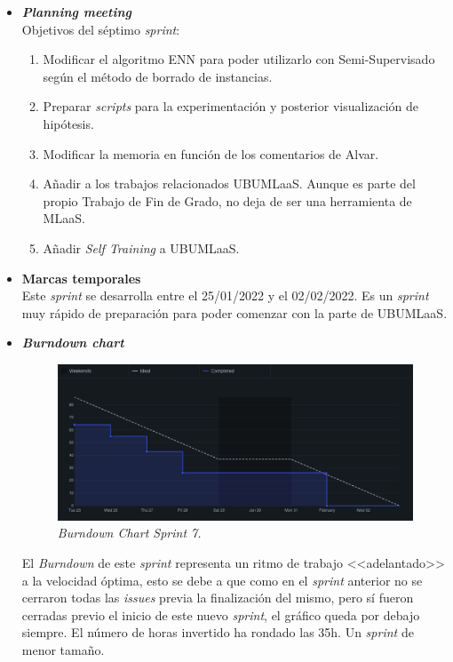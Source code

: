 \begin{itemize}
\item \textbf{\textit{Planning meeting}}\\
Objetivos del séptimo \textit{sprint}:
\begin{enumerate}
\item Modificar el algoritmo ENN para poder utilizarlo con Semi-Supervisado según el método de borrado de instancias.
\item Preparar \textit{scripts} para la experimentación y posterior visualización de hipótesis.
\item Modificar la memoria en función de los comentarios de Alvar.
\item Añadir a los trabajos relacionados UBUMLaaS. Aunque es parte del propio Trabajo de Fin de Grado, no deja de ser una herramienta de MLaaS.
\item Añadir \textit{Self Training} a UBUMLaaS.
\end{enumerate}

\item \textbf{Marcas temporales}\\
Este \textit{sprint} se desarrolla entre el 25/01/2022 y el 02/02/2022. Es un \textit{sprint} muy rápido de preparación para poder comenzar con la parte de UBUMLaaS.

\item \textbf{\textit{Burndown chart}}\\
\begin{figure}
\begin{center}
\includegraphics[width=\textwidth]{../img/anexos/sprints/BD-Sprint7}
\caption{\textit{Burndown Chart Sprint 7.}}\label{fig:BD-Sprint7}
\end{center}
\end{figure}
El \textit{Burndown} de este \textit{sprint} representa un ritmo de trabajo <<adelantado>> a la velocidad óptima, esto se debe a que como en el \textit{sprint} anterior no se cerraron todas las \textit{issues} previa la finalización del mismo, pero sí fueron cerradas previo el inicio de este nuevo \textit{sprint}, el gráfico queda por debajo siempre. El número de horas invertido ha rondado las 35h. Un \textit{sprint} de menor tamaño.


\end{itemize}
